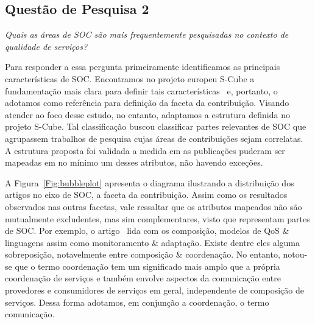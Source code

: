 \subsection{Quest\~{a}o de Pesquisa 2}
\emph{Quais as áreas de SOC são mais frequentemente pesquisadas no contexto de qualidade de serviços?}


Para responder a essa pergunta primeiramente identificamos as principais caracter\'{i}sticas de SOC. Encontramos no projeto europeu S-Cube a fundamenta\c{c}\~{a}o mais clara para definir tais caracter\'{i}sticas~\cite{SCube-FINALREPORT} e, portanto, o adotamos como refer\^{e}ncia para definição da faceta da contribui\c{c}\~{a}o. Visando atender ao foco desse estudo, no entanto, adaptamos a estrutura definida no projeto S-Cube. Tal classificação buscou classificar partes relevantes de SOC que agrupassem trabalhos de pesquisa cujas áreas de contribuições sejam correlatas. A estrutura proposta foi validada a medida em as publicações puderam ser mapeadas em no mínimo um desses atributos, não havendo exceções. 


A Figura~\ref{Fig:bubbleplot} apresenta o diagrama ilustrando a distribui\c{c}\~{a}o dos artigos no eixo de SOC, a faceta da contribui\c{c}\~{a}o. Assim como os resultados observados nas outras facetas, vale ressaltar que os atributos mapeados não são mutualmente excludentes, mas sim complementares, visto que representam partes de SOC. Por exemplo, o artigo~\cite{A QoS-aware fault tolerant middleware for dependable service composition} lida com os composi\c{c}\~{a}o, modelos de QoS \& linguagens assim como monitoramento \& adapta\c{c}\~{a}o. Existe dentre eles alguma sobreposição, notavelmente entre composição & coordenação. No entanto, notou-se que o termo coordenação tem um significado mais amplo que a própria coordenação de serviços e também envolve aspectos da comunicação entre provedores e consumidores de serviços em geral, independente de composição de serviços. Dessa forma adotamos, em conjunção a coordenação, o termo comunicação.

